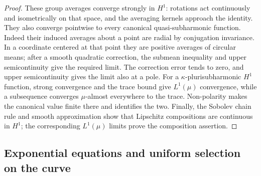 \begin{proof}
These group averages converge strongly in $H^1$: rotations act continuously and isometrically on that space, and the averaging kernels approach the identity. They also converge pointwise to every canonical quasi-subharmonic function. Indeed their induced averages about a point are radial by conjugation invariance. In a coordinate centered at that point they are positive averages of circular means; after a smooth quadratic correction, the submean inequality and upper semicontinuity give the required limit. The correction error tends to zero, and upper semicontinuity gives the limit also at a pole. For a $\kappa$-plurisubharmonic $H^1$ function, strong convergence and the trace bound give $L^1(\mu)$ convergence, while a subsequence converges $\mu$-almost everywhere to the trace. Non-polarity makes the canonical value finite there and identifies the two. Finally, the Sobolev chain rule and smooth approximation show that Lipschitz compositions are continuous in $H^1$; the corresponding $L^1(\mu)$ limits prove the composition assertion.
\end{proof}

\subsection{Exponential equations and uniform selection on the curve}


